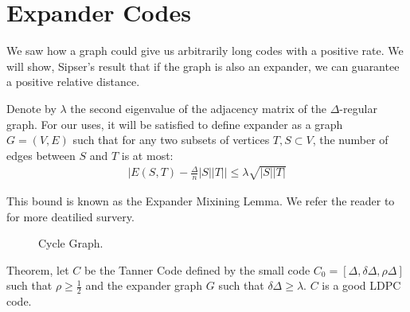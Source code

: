 

  \section{Expander Codes}
  We saw how a graph could give us arbitrarily long codes with a positive rate. We will show, Sipser's result \cite{ExpanderCodes} that if the graph is also an expander, we can guarantee a positive relative distance. 
  \begin{definition} Denote by $\lambda$ the second eigenvalue of the adjacency matrix of the $\Delta$-regular graph. For our uses, it will be satisfied to define expander as a graph $G = \left( V,E \right)$ such that for any two subsets of vertices $T,S \subset V$, the number of edges between $S$ and $T$ is at most:
  \begin{equation*}
    \begin{split}
      \mid E\left( S,T \right) - \frac{\Delta}{n}|S||T| \mid \le \lambda\sqrt{|S| |T|} 
    \end{split}
  \end{equation*}
\end{definition}
This bound is known as the Expander Mixining Lemma. We refer the reader to \cite{hoory2006expander} for more deatilied survery. 
\begin{figure}[h]
  \label{fig:expander}
 
\caption{Cycle Graph.}
\end{figure}
  \begin{theorem*} Theorem, let $C$ be the Tanner Code defined by the small code $C_{0} = [\Delta,\delta\Delta, \rho\Delta ]$ such that $\rho \ge \frac{1}{2}$ and the expander graph $G$ such that $\delta\Delta \ge \lambda$. $C$ is a good  LDPC code.
  \end{theorem*}
